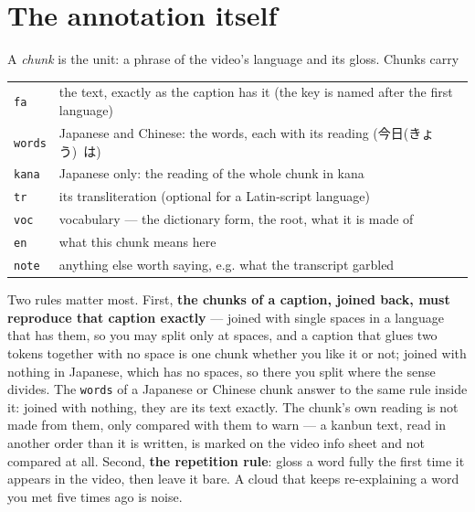 \documentclass[11pt,oneside]{report}
\newcommand{\jw}[1]{\mbox{\foreignlanguage{japanese}{#1}}}
\newcommand{\menu}[1]{\textsf{#1}}
\begin{document}
\section{The annotation itself}

A \emph{chunk} is the unit: a phrase of the video's language and its gloss.
Chunks carry

\begin{center}
\begin{tabular}{@{}ll@{}}
\toprule
\texttt{fa}   & the text, exactly as the caption has it (the key is named after the first language) \\
\texttt{words} & Japanese and Chinese: the words, each with its reading (\jw{今日(きょう) は}) \\
\texttt{kana} & Japanese only: the reading of the whole chunk in kana \\
\texttt{tr}   & its transliteration (optional for a Latin-script language) \\
\texttt{voc}  & vocabulary --- the dictionary form, the root, what it is made of \\
\texttt{en}   & what this chunk means here \\
\texttt{note} & anything else worth saying, e.g. what the transcript garbled \\
\bottomrule
\end{tabular}
\end{center}

Two rules matter most. First, \textbf{the chunks of a caption, joined back,
must reproduce that caption exactly} --- joined with single spaces in a
language that has them, so you may split only at spaces, and a caption that
glues two tokens together with no space is one chunk whether you like it or
not; joined with nothing in Japanese, which has no spaces, so there you
split where the sense divides. The \texttt{words} of a Japanese or Chinese
chunk answer to the same rule inside it: joined with nothing, they are its
text exactly. The chunk's own reading is not made from them, only compared
with them to warn --- a kanbun text, read in another order than it is
written, is marked on the \menu{video info} sheet and not compared at all. Second, \textbf{the repetition rule}:
gloss a word fully the first time it appears in the video, then leave it
bare. A cloud that keeps re-explaining a word you met five times ago is
noise.
\end{document}
